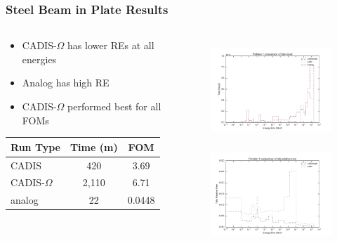 \documentclass[xcolor=x11names,compress]{beamer}
\renewcommand{\(}{\begin{columns}}
\renewcommand{\)}{\end{columns}}
\newcommand{\<}[1]{\begin{column}{#1}}
\renewcommand{\>}{\end{column}}
\begin{document}
\begin{frame}[fragile]
  \frametitle{Steel Beam in Plate Results}
  
\begin{columns}
  \begin{column}{0.45\textwidth}
  \begin{itemize}
    \item CADIS-$\Omega$ has lower REs at all energies
    \item Analog has high RE
    \item CADIS-$\Omega$ performed best for all FOMs
  \end{itemize}
  \vspace*{1em}
  
  \begin{tabular}{|l|c c|}
  \hline
      Run Type & Time (m) & FOM \\  
      \hline
      CADIS  & 420  &  3.69 \\
      CADIS-$\Omega$ & 2,110 & \alert{6.71} \\
      analog & 22 &  0.0448 \\
      \hline
  \end{tabular}  
  \end{column}
  \begin{column}{0.55\textwidth}
  	\begin{figure}
  	\begin{center}
  		\includegraphics[height=1.5in,clip]{../figs/steel_beam_tally_result_compare.pdf}\\
  		\includegraphics[height=1.5in,clip]{../figs/steel_beam_tally_error_compare.pdf}
	\end{center}
  	\end{figure}
  \end{column}
\end{columns}
\end{frame}
\end{document}
